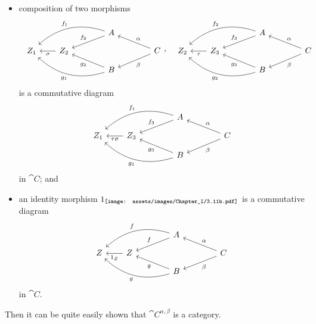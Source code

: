 {\begin{itemize}[label=$\bullet$]
        \item composition of two morphisms
        $$\begin{array}{ll}
            \begin{tikzcd}[row sep=0.8em,column sep=2em,ampersand replacement=\&]
                \& \&\& A \ar[dll, swap, "f_2"] \ar[dlll, swap, bend right, "f_1"] \\
                Z_1 \& Z_2 \ar[l, "\sigma"] \&\&\&\& C \ar[dll, "\beta"] \ar[ull, swap, "\alpha"]\\
                \& \&\& B \ar[ull, "g_2"] \ar[ulll, bend left, "g_1"]
            \end{tikzcd}, &
            \begin{tikzcd}[row sep=0.8em,column sep=2em,ampersand replacement=\&]
                \& \&\& A \ar[dll, swap, "f_3"] \ar[dlll, swap, bend right, "f_2"] \\
                Z_2 \& Z_3 \ar[l, "\tau"] \&\&\&\& C \ar[dll, "\beta"] \ar[ull, swap, "\alpha"]\\
                \& \&\& B \ar[ull, "g_3"] \ar[ulll, bend left, "g_2"]
            \end{tikzcd}
        \end{array}$$
        is a commutative diagram
        \[\begin{tikzcd}[row sep=0.8em,column sep=2em,ampersand replacement=\&]
            \& \&\& A \ar[dll, swap, "f_3"] \ar[dlll, swap, bend right, "f_1"] \\
            Z_1 \& Z_3 \ar[l, "\tau\sigma"] \&\&\&\& C \ar[dll, "\beta"] \ar[ull, swap, "\alpha"]\\
            \& \&\& B \ar[ull, "g_3"] \ar[ulll, bend left, "g_1"]
        \end{tikzcd}\]
        in $\cat{C}$; and

        \item an identity morphism $\mathrm{1}_{\texttt{[image: assets/images/Chapter\_I/3.11b.pdf]}}$ is a commutative diagram
        \[\begin{tikzcd}[row sep=0.8em,column sep=2em,ampersand replacement=\&]
            \& \&\& A \ar[dll, swap, "f"] \ar[dlll, swap, bend right, "f"] \\
            Z \& Z \ar[l, "\one_Z"] \&\&\&\& C \ar[dll, "\beta"] \ar[ull, swap, "\alpha"]\\
            \& \&\& B \ar[ull, "g"] \ar[ulll, bend left, "g"]
        \end{tikzcd}\]
        in $\cat{C}$.
    \end{itemize}
    Then it can be quite easily shown that $\cat{C}^{\alpha,\beta}$ is a category.
}